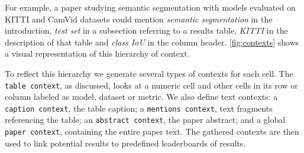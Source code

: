 \documentclass[11pt,a4paper]{article}
\begin{document}
For example, a paper studying semantic segmentation with models evaluated on KITTI and CamVid datasets could mention \textit{semantic segmentation} in the introduction, \textit{test set} in a subsection referring to a results table, \textit{KITTI} in the description of that table and \textit{class IoU} in the column header. \cref{fig:contexts} shows a visual representation of this hierarchy of context. 

To reflect this hierarchy we generate several types of contexts for each cell. The \texttt{table context}, as discussed, looks at a numeric cell and other cells in its row or column labeled as model, dataset or metric. We also define text contexts: a \texttt{caption context}, the table caption; a \texttt{mentions context}, text fragments referencing the table; an \texttt{abstract context}, the paper abstract; and a global \texttt{paper context}, containing the entire paper text. The gathered contexts are then used to link potential results to predefined leaderboards of results.
\end{document}

